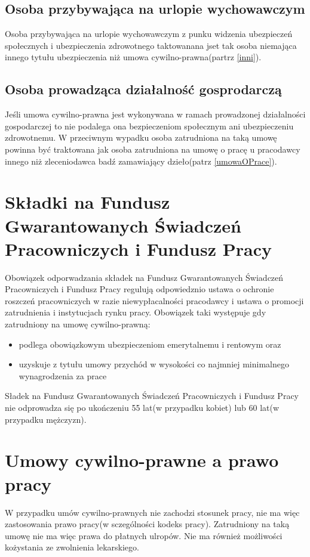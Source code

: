 \subsection[Osoba przybywająca na urlopie wychowawczym][Osoba przybywająca na urlopie wychowawczym]{Osoba przybywająca na urlopie wychowawczym}
Osoba przybywająca na urlopie wychowawczym z punku widzenia ubezpieczeń społecznych i ubezpieczenia zdrowotnego taktowanana jset tak osoba niemająca innego tytułu ubezpieczenia niż umowa cywilno-prawna(partrz \ref{inni}).

\subsection[Osoba prowadząca działalność gosprodarczą][Osoba prowadząca działalność gosprodarczą]{Osoba prowadząca działalność gosprodarczą}
Jeśli umowa cywilno-prawna jest wykonywana w ramach prowadzonej działalności gospodarczej to nie podalega ona bezpieczeniom społecznym ani ubezpieczeniu zdrowotnemu. W przeciwnym wypadku osoba zatrudniona na taką umowę powinna być traktowana jak osoba zatrudniona na umowę o pracę u pracodawcy innego niż zleceniodawca badź zamawiający dzieło(patrz \ref{umowaOPrace}).

\section{Składki na Fundusz Gwarantowanych Świadczeń Pracowniczych i Fundusz Pracy}
Obowiązek odporwadzania składek na Fundusz Gwarantowanych Świadczeń Pracowniczych i Fundusz Pracy regulują odpowiedznio ustawa o ochronie roszczeń pracowniczych w razie niewypłacalności pracodawcy\cite{TODO} i ustawa o promocji zatrudnienia i instytucjach rynku pracy. Obowiązek taki występuje gdy zatrudniony na umowę cywilno-prawną:
\begin{itemize}
	\item podlega obowiązkowym ubezpieczeniom emerytalnemu i rentowym oraz
	\item uzyskuje z tytułu umowy przychód w wysokości co najmniej minimalnego wynagrodzenia za prace
\end{itemize}
Sładek na Fundusz Gwarantowanych Świadczeń Pracowniczych i Fundusz Pracy nie odprowadza się po ukończeniu 55 lat(w przypadku kobiet) lub 60 lat(w przypadku mężczyzn).

\section[Umowy cywilno-prawne a prawo pracy][Umowy cywilno-prawne a prawo pracy]{Umowy cywilno-prawne a prawo pracy}
W przypadku umów cywilno-prawnych nie zachodzi stosunek pracy, nie ma więc zastosowania prawo pracy(w sczególności kodeks pracy). Zatrudniony na taką umowę nie ma więc prawa do płatnych ulropów. Nie ma również możliwości kożystania ze zwolnienia lekarskiego.

